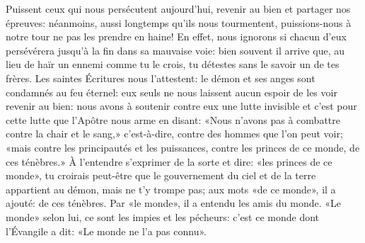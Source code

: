 Puissent ceux qui nous persécutent aujourd’hui,
	revenir au bien et partager nos épreuves:
	néanmoins, aussi longtemps qu’ils nous tourmentent,
	puissions-nous à notre tour ne pas les prendre en haine!
En effet, nous ignorons si chacun d’eux
		persévérera jusqu'à la fin dans sa mauvaise voie:
	bien souvent il arrive que, au lieu de haïr un ennemi comme tu le crois,
	tu détestes sans le savoir un de tes frères.
Les saintes Écritures nous l’attestent:
	le démon et ses anges sont condamnés au feu éternel:
	eux seuls ne nous laissent aucun espoir de les voir revenir au bien:
	nous avons à soutenir contre eux une lutte invisible
	et c’est pour cette lutte que l’Apôtre nous arme en disant:
	«Nous n’avons pas à combattre contre la chair et le sang,»
	c’est-à-dire, contre des hommes que l’on peut voir;
	«mais contre les principautés et les puissances,
	contre les princes de ce monde, de ces ténèbres.»
À l’entendre s’exprimer de la sorte et dire: «les princes de ce monde»,
	tu croirais peut-être
		que le gouvernement du ciel et de la terre appartient au démon,
	mais ne t’y trompe pas;
	aux mots «de ce monde», il a ajouté: de ces ténèbres.
Par «le monde», il a entendu les amis du monde.
«Le monde» selon lui, ce sont les impies et les pécheurs:
	c’est ce monde dont l’Évangile a dit: «Le monde ne l’a pas connu».
